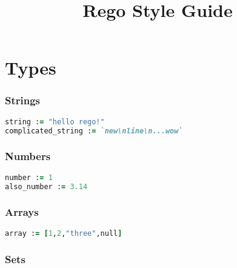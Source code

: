 \documentclass[twocolumn]{article}
\makeatletter
\renewcommand{\maketitle}{\bgroup\setlength{\parindent}{0pt}
  \textbf{\LARGE{\@title}}
}
\makeatother
\begin{document}
\title{Rego Style Guide}

\maketitle
\vspace{-1em}


\section*{Types}




\vspace{-1em}
\subsubsection*{Strings}

\begin{lstlisting}[language=Ruby]
string := "hello rego!"
complicated_string := `new\nline\n...wow`
\end{lstlisting}





\vspace{-1em}
\subsubsection*{Numbers}

\begin{lstlisting}[language=Ruby]
number := 1
also_number := 3.14
\end{lstlisting}





\vspace{-1em}
\subsubsection*{Arrays}

\begin{lstlisting}[language=Ruby]
array := [1,2,"three",null]
\end{lstlisting}





\vspace{-1em}
\subsubsection*{Sets}
\end{document}
